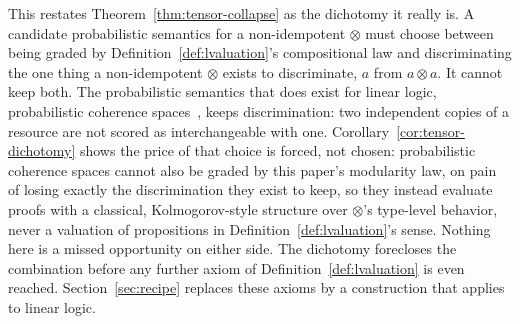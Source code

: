 \noindent
This restates Theorem~\ref{thm:tensor-collapse} as the dichotomy it
really is. A candidate probabilistic semantics for a non-idempotent
$\otimes$ must choose between being graded by
Definition~\ref{def:lvaluation}'s compositional law and
discriminating the one thing a non-idempotent $\otimes$ exists to
discriminate, $a$ from $a \otimes a$. It cannot keep both. The
probabilistic semantics that does exist for linear logic,
probabilistic coherence spaces~\cite{danos-ehrhard2011}, keeps
discrimination: two independent copies of a resource are not scored
as interchangeable with one. Corollary~\ref{cor:tensor-dichotomy}
shows the price of that choice is forced, not chosen: probabilistic
coherence spaces cannot also be graded by this paper's modularity
law, on pain of losing exactly the discrimination they exist to
keep, so they instead evaluate proofs with a classical,
Kolmogorov-style structure over $\otimes$'s type-level behavior,
never a valuation of propositions in Definition~\ref{def:lvaluation}'s
sense. Nothing here is a missed opportunity on either side. The
dichotomy forecloses the combination before any further axiom of
Definition~\ref{def:lvaluation} is even reached. Section~\ref{sec:recipe} replaces these axioms by a construction
that applies to linear logic.

